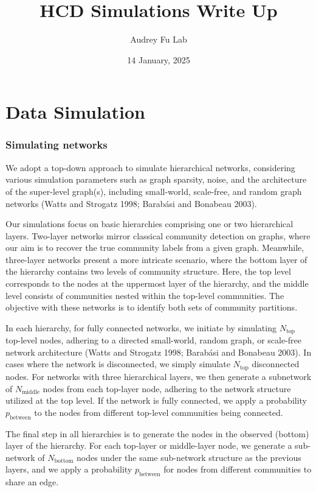 \documentclass[
]{article}
\title{HCD Simulations Write Up}
\author{Audrey Fu Lab}
\date{14 January, 2025}
\begin{document}
\maketitle

\section*{Data Simulation}\label{data-simulation}

\subsubsection*{Simulating networks}\label{simulating-networks}

We adopt a top-down approach to simulate hierarchical networks,
considering various simulation parameters such as graph sparsity, noise,
and the architecture of the super-level graph(s), including small-world,
scale-free, and random graph networks (Watts and Strogatz 1998; Barabási
and Bonabeau 2003).

Our simulations focus on basic hierarchies comprising one or two
hierarchical layers. Two-layer networks mirror classical community
detection on graphs, where our aim is to recover the true community
labels from a given graph. Meanwhile, three-layer networks present a
more intricate scenario, where the bottom layer of the hierarchy
contains two levels of community structure. Here, the top level
corresponds to the nodes at the uppermost layer of the hierarchy, and
the middle level consists of communities nested within the top-level
communities. The objective with these networks is to identify both sets
of community partitions.

In each hierarchy, for fully connected networks, we initiate by
simulating \(N_{\text{top}}\) top-level nodes, adhering to a directed
small-world, random graph, or scale-free network architecture (Watts and
Strogatz 1998; Barabási and Bonabeau 2003). In cases where the network
is disconnected, we simply simulate \(N_{\text{top}}\) disconnected
nodes. For networks with three hierarchical layers, we then generate a
subnetwork of \(N_{\text{middle}}\) nodes from each top-layer node,
adhering to the network structure utilized at the top level. If the
network is fully connected, we apply a probability \(p_\text{between}\)
to the nodes from different top-level communities being connected.

The final step in all hierarchies is to generate the nodes in the
observed (bottom) layer of the hierarchy. For each top-layer or
middle-layer node, we generate a sub-network of \(N_{\text{bottom}}\)
nodes under the same sub-network structure as the previous layers, and
we apply a probability \(p_\text{between}\) for nodes from different
communities to share an edge.
\end{document}
